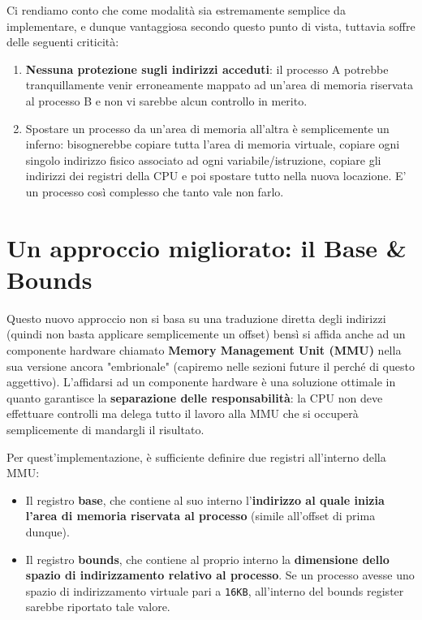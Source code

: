\documentclass[12pt]{report}
\begin{document}
	Ci rendiamo conto che come modalità sia estremamente semplice da implementare, e dunque vantaggiosa secondo questo punto di vista, tuttavia soffre delle seguenti criticità:
	\begin{enumerate}
		\item \textbf{Nessuna protezione sugli indirizzi acceduti}: il processo A potrebbe tranquillamente venir erroneamente mappato ad un'area di memoria riservata al processo B e non vi sarebbe alcun controllo in merito.
		
		\item Spostare un processo da un'area di memoria all'altra è semplicemente un inferno: bisognerebbe copiare tutta l'area di memoria virtuale, copiare ogni singolo indirizzo fisico associato ad ogni variabile/istruzione, copiare gli indirizzi dei registri della CPU e poi spostare tutto nella nuova locazione. E' un processo così complesso che tanto vale non farlo.
	\end{enumerate}
	
	\section{Un approccio migliorato: il Base \& Bounds}
	Questo nuovo approccio non si basa su una traduzione diretta degli indirizzi (quindi non basta applicare semplicemente un offset) bensì si affida anche ad un componente hardware chiamato \textbf{Memory Management Unit (MMU)} nella sua versione ancora "embrionale" (capiremo nelle sezioni future il perché di questo aggettivo). L'affidarsi ad un componente hardware è una soluzione ottimale in quanto garantisce la \textbf{separazione delle responsabilità}: la CPU non deve effettuare controlli ma delega tutto il lavoro alla MMU che si occuperà semplicemente di mandargli il risultato.
	\smallbreak
	
	Per quest'implementazione, è sufficiente definire due registri all'interno della MMU:
	\begin{itemize}
		\item Il registro \textbf{base}, che contiene al suo interno l'\textbf{indirizzo al quale inizia l'area di memoria riservata al processo} (simile all'offset di prima dunque).
		
		\item Il registro \textbf{bounds}, che contiene al proprio interno la \textbf{dimensione dello spazio di indirizzamento relativo al processo}. Se un processo avesse uno spazio di indirizzamento virtuale pari a \texttt{16KB}, all'interno del bounds register sarebbe riportato tale valore.
	\end{itemize}
	
\end{document}
